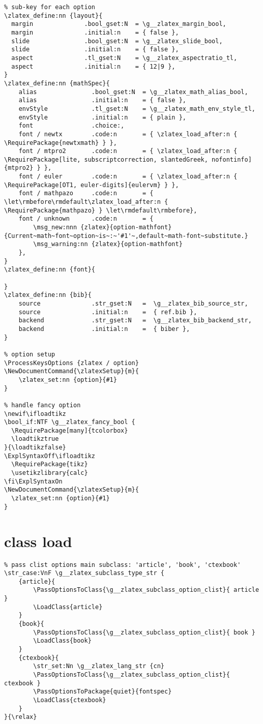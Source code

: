 \begin{verbatim}
% sub-key for each option
\zlatex_define:nn {layout}{
  margin              .bool_gset:N  = \g__zlatex_margin_bool,
  margin              .initial:n    = { false },
  slide               .bool_gset:N  = \g__zlatex_slide_bool,
  slide               .initial:n    = { false },
  aspect              .tl_gset:N    = \g__zlatex_aspectratio_tl,
  aspect              .initial:n    = { 12|9 },
}
\zlatex_define:nn {mathSpec}{
    alias               .bool_gset:N  = \g__zlatex_math_alias_bool,
    alias               .initial:n    = { false },
    envStyle            .tl_gset:N    = \g__zlatex_math_env_style_tl,
    envStyle            .initial:n    = { plain },
    font                .choice:,
    font / newtx        .code:n       = { \zlatex_load_after:n { \RequirePackage{newtxmath} } },
    font / mtpro2       .code:n       = { \zlatex_load_after:n { \RequirePackage[lite, subscriptcorrection, slantedGreek, nofontinfo]{mtpro2} } },
    font / euler        .code:n       = { \zlatex_load_after:n { \RequirePackage[OT1, euler-digits]{eulervm} } },
    font / mathpazo     .code:n       = { \let\rmbefore\rmdefault\zlatex_load_after:n { \RequirePackage{mathpazo} } \let\rmdefault\rmbefore},
    font / unknown      .code:n       = {
        \msg_new:nnn {zlatex}{option-mathfont}{Current~math~font~option~is~:~'#1'~,default~math-font~substitute.}
        \msg_warning:nn {zlatex}{option-mathfont}
    },
}
\zlatex_define:nn {font}{

}
\zlatex_define:nn {bib}{
    source              .str_gset:N   =  \g__zlatex_bib_source_str,
    source              .initial:n    =  { ref.bib },
    backend             .str_gset:N   =  \g__zlatex_bib_backend_str,
    backend             .initial:n    =  { biber },
}

% option setup
\ProcessKeysOptions {zlatex / option}
\NewDocumentCommand{\zlatexSetup}{m}{
    \zlatex_set:nn {option}{#1}
}

% handle fancy option
\newif\ifloadtikz
\bool_if:NTF \g__zlatex_fancy_bool {
  \RequirePackage[many]{tcolorbox}
  \loadtikztrue
}{\loadtikzfalse}
\ExplSyntaxOff\ifloadtikz
  \RequirePackage{tikz}
  \usetikzlibrary{calc}
\fi\ExplSyntaxOn
\NewDocumentCommand{\zlatexSetup}{m}{
  \zlatex_set:nn {option}{#1}
}
\end{verbatim}

\section{class load}
\begin{verbatim}
% pass clist options main subclass: 'article', 'book', 'ctexbook'
\str_case:VnF \g__zlatex_subclass_type_str {
    {article}{
        \PassOptionsToClass{\g__zlatex_subclass_option_clist}{ article }
        \LoadClass{article}
    }
    {book}{
        \PassOptionsToClass{\g__zlatex_subclass_option_clist}{ book }
        \LoadClass{book}   
    }
    {ctexbook}{
        \str_set:Nn \g__zlatex_lang_str {cn}
        \PassOptionsToClass{\g__zlatex_subclass_option_clist}{ ctexbook }
        \PassOptionsToPackage{quiet}{fontspec}
        \LoadClass{ctexbook}    
    }
}{\relax}
\end{verbatim}

